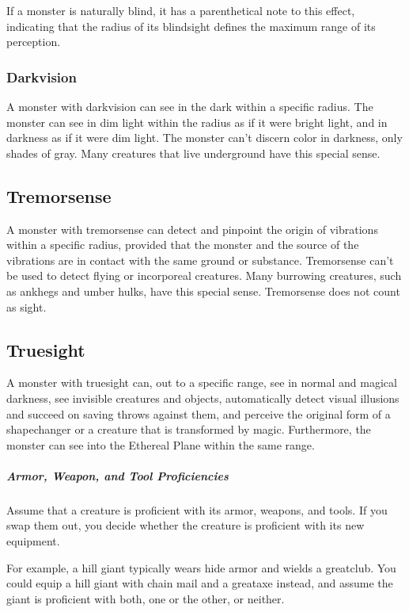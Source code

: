 If a monster is naturally blind, it has a parenthetical note to this effect, indicating that the radius of its blindsight defines the maximum range of its perception.

\subsubsection{Darkvision}

A monster with darkvision can see in the dark within a specific radius. The monster can see in dim light within the radius as if it were bright light, and in darkness as if it were dim light. The monster can't discern color in darkness, only shades of gray. Many creatures that live underground have this special sense.

\subsection{Tremorsense}

A monster with tremorsense can detect and pinpoint the origin of vibrations within a specific radius, provided that the monster and the source of the vibrations are in contact with the same ground or substance. Tremorsense can't be used to detect flying or incorporeal creatures. Many burrowing creatures, such as ankhegs and umber hulks, have this special sense. Tremorsense does not count as sight.

\subsection{Truesight}

A monster with truesight can, out to a specific range, see in normal and magical darkness, see invisible creatures and objects, automatically detect visual illusions and succeed on saving throws against them, and perceive the original form of a shapechanger or a creature that is transformed by magic. Furthermore, the monster can see into the Ethereal Plane within the same range.

\subparagraph*{Armor, Weapon, and Tool Proficiencies}

Assume that a creature is proficient with its armor, weapons, and tools. If you swap them out, you decide whether the creature is proficient with its new equipment.

For example, a hill giant typically wears hide armor and wields a greatclub. You could equip a hill giant with chain mail and a greataxe instead, and assume the giant is proficient with both, one or the other, or neither.

